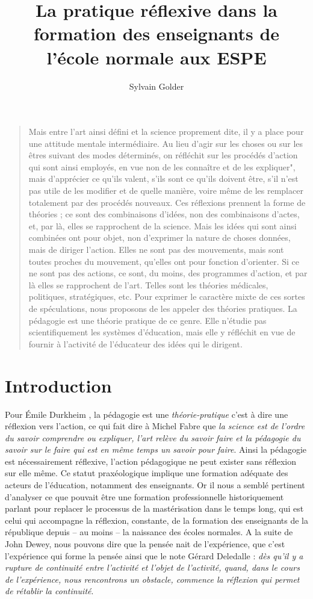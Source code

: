 \documentclass[a4paper,11pt]{article}
\title{La pratique réflexive dans la formation des enseignants de l'école normale aux ESPE}
\author{Sylvain Golder}
\begin{document}
\maketitle

\begin{quote}
  Mais entre l'art ainsi défini et la science proprement dite, il y a place pour une attitude mentale intermédiaire. Au lieu d'agir sur les choses ou sur les êtres suivant des modes déterminés, on réfléchit sur les procédés d'action qui sont ainsi employés, en vue non de les connaître et de les expliquer", mais d'apprécier ce qu'ils valent, s'ils sont ce qu'ils doivent être, s'il n'est pas utile de les modifier et de quelle manière, voire même de les remplacer totalement par des procédés nouveaux. Ces réflexions prennent la forme de théories ; ce sont des combinaisons d'idées, non des combinaisons d'actes, et, par là, elles se rapprochent de la science. Mais les idées qui sont ainsi combinées ont pour objet, non d'exprimer la nature de choses données, mais de diriger l'action. Elles ne sont pas des mouvements, mais sont toutes proches du mouvement, qu'elles ont pour fonction d'orienter. Si ce ne sont pas des actions, ce sont, du moins, des programmes d'action, et par là elles se rapprochent de l'art. Telles sont les théories médicales, politiques, stratégiques, etc. Pour exprimer le caractère mixte de ces sortes de spéculations, nous proposons de les appeler des théories pratiques. La pédagogie est une théorie pratique de ce genre. Elle n'étudie pas scientifiquement les systèmes d'éducation, mais elle y réfléchit en vue de fournir à l'activité de l'éducateur des idées qui le dirigent.  \cite{durkheim11}
\end{quote}

\part*{Introduction}
Pour Émile Durkheim \cite{durkheim11}, la pédagogie est une \emph{théorie-pratique} c'est à dire une réflexion vers l'action, ce qui fait dire à Michel Fabre \cite{fabre02} que \emph{la science est de l'ordre du savoir comprendre ou expliquer, l'art relève du savoir faire et la pédagogie du savoir sur le faire qui est en même temps un savoir pour faire}. Ainsi la pédagogie est nécessairement réflexive, l'action pédagogique ne peut exister sans réflexion sur elle même. Ce statut praxéologique implique une formation adéquate des acteurs de l'éducation, notamment des enseignants. Or il nous a semblé pertinent d'analyser ce que pouvait être une formation professionnelle historiquement parlant pour replacer le processus de la mastérisation dans le temps long, qui est celui qui accompagne la réflexion, constante, de la formation des enseignants de la république depuis – au moins – la naissance des écoles normales. A la suite de John Dewey, nous pouvons dire que la pensée nait de l'expérience, que c'est l'expérience qui forme la pensée ainsi que le note Gérard Deledalle \cite{deledalle65} : \emph{dès qu'il y a rupture de continuité entre l'activité et l'objet de l'activité, quand, dans le cours de l'expérience, nous rencontrons un obstacle, commence la réflexion qui permet de rétablir la continuité}. \\
\end{document}

